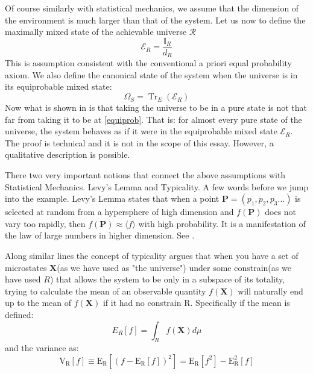 \documentclass[a4paper,12pt]{article}
\begin{document}
Of course similarly with statistical mechanics, we assume that the dimension of the environment is much larger than that of the system. Let us now to define the maximally mixed state of the achievable universe $\mathcal{R}$ 
\begin{equation}
\mathcal{E}_{R}=\frac{\mathbb{I}_{R}}{d_{R}}
\label{equiprob}
\end{equation}
This is assumption consistent with the conventional a priori equal probability axiom. We also define the canonical state of the system when the universe is in its equiprobable mixed state:
\begin{equation}\Omega_{S}=\operatorname{Tr}_{E}\left(\mathcal{E}_{R}\right)
\end{equation}
Now what is shown in \cite{popescu2006entanglement} is that taking the universe to be in a pure state is not that far from taking it to be at \eqref{equiprob}. That is: for almost every pure state of
the universe, the system behaves as if it were in the equiprobable mixed state $\mathcal{E}_{R}$. The proof is technical and it is not in the scope of this essay. However, a qualitative description is possible.
\par There two very important notions that connect the above assumptions with Statistical Mechanics. Levy's Lemma and Typicality. A few words before we jump into the example. Levy's Lemma states that when a point $\textbf{P}=(p_1,p_2,p_3...)$ is selected at random from a hypersphere of high dimension
and $f(\textbf{P})$ does not vary too rapidly, then $f(\textbf{P}) \approx\langle f\rangle$ with
high probability. It is a manifestation of the law of large numbers in higher dimension. See \cite{milman2009asymptotic}.
\par
Along similar lines the concept of typicality argues that when you have a set of microstates $\textbf{X}$(as we have used as "the universe") under some constrain(as we have used $R$) that allows the system to be only in a subspace of its totality, trying to calculate the mean of an observable quantity $f(\textbf{X})$ will naturally end up to the mean of $f(\textbf{X})$ if it had no constrain R. Specifically if the mean is defined:
\begin{equation}
E_R[f]=\int_{R} f(\textbf{X}) d \mu
\end{equation}
and the variance as:
\begin{equation}\mathrm{V}_{\mathrm{R}}[f] \equiv \mathrm{E}_{\mathrm{R}}\left[\left(f-\mathrm{E}_{\mathrm{R}}[f]\right)^{2}\right]=\mathrm{E}_{\mathrm{R}}\left[f^{2}\right]-\mathrm{E}_{\mathrm{R}}^{2}[f]
\end{equation}
\end{document}
